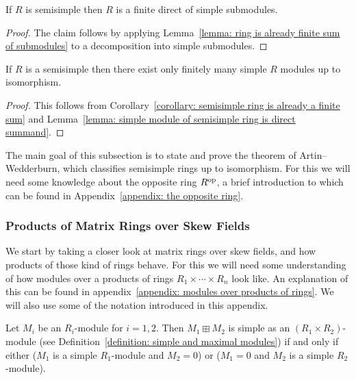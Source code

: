 \begin{corollary}
  \label{corollary: semisimple ring is already a finite sum}
  If $R$ is semisimple then $R$ is a finite direct of simple submodules.
\end{corollary}


\begin{proof}
 The claim follows by applying Lemma~\ref{lemma: ring is already finite sum of submodules} to a decomposition into simple submodules.
\end{proof}


\begin{corollary}
  \label{corollary: ss rings have only finitely many simple modules}
  If $R$ is a semisimple then there exist only finitely many simple $R$ modules up to isomorphism.
\end{corollary}


\begin{proof}
  This follows from Corollary~\ref{corollary: semisimple ring is already a finite sum} and Lemma~\ref{lemma: simple module of semisimple ring is direct summand}.
\end{proof}


\begin{fluff}
  The main goal of this subsection is to state and prove the theorem of Artin--Wedderburn, which classifies semisimple rings up to isomorphism.
  For this we will need some knowledge about the opposite ring $R^{\mathrm{op}}$, a brief introduction to which can be found in Appendix~\ref{appendix: the opposite ring}.
\end{fluff}





\subsubsection{Products of Matrix Rings over Skew Fields}


\begin{fluff}
  We start by taking a closer look at matrix rings over skew fields, and how products of those kind of rings behave.
  For this we will need some understanding of how modules over a products of rings $R_1 \times \dotsb \times R_n$ look like.
  An explanation of this can be found in appendix~\ref{appendix: modules over products of rings}.
  We will also use some of the notation introduced in this appendix.
\end{fluff}


\begin{lemma}
  Let $M_i$ be an $R_i$-module for $i = 1, 2$.
  Then $M_1 \boxplus M_2$ is simple as an $(R_1 \times R_2)$-module (see Definition~\ref{definition: simple and maximal modules}) if and only if either ($M_1$ is a simple $R_1$-module and $M_2 = 0$) or ($M_1 = 0$ and $M_2$ is a simple $R_2$-module).
\end{lemma}



